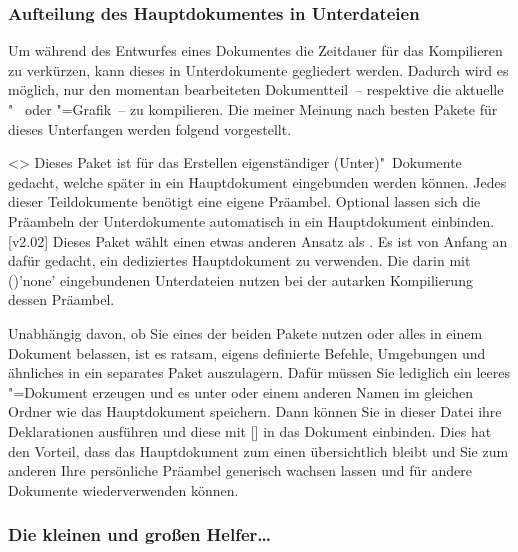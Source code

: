 \subsubsection{%
  Aufteilung des Hauptdokumentes in Unterdateien%
}

Um während des Entwurfes eines Dokumentes die Zeitdauer für das Kompilieren zu 
verkürzen, kann dieses in Unterdokumente gegliedert werden. Dadurch wird es 
möglich, nur den momentan bearbeiteten Dokumentteil~-- respektive die aktuelle 
"~ oder "=Grafik~-- zu kompilieren. Die meiner 
Meinung nach besten Pakete für dieses Unterfangen werden folgend vorgestellt.

\begin{DeclarePackages}
<>
  Dieses Paket ist für das Erstellen eigenständiger (Unter)"~Dokumente gedacht, 
  welche später in ein Hauptdokument eingebunden werden können. Jedes dieser 
  Teildokumente benötigt eine eigene Präambel. Optional lassen sich die 
  Präambeln der Unterdokumente automatisch in ein Hauptdokument einbinden.
[v2.02]
  Dieses Paket wählt einen etwas anderen Ansatz als . Es 
  ist von Anfang an dafür gedacht, ein dediziertes Hauptdokument zu verwenden. 
  Die darin mit ()'none' eingebundenen 
  Unterdateien nutzen bei der autarken Kompilierung dessen Präambel.
\end{DeclarePackages}

Unabhängig davon, ob Sie eines der beiden Pakete nutzen oder alles in einem 
Dokument belassen, ist es ratsam, eigens definierte Befehle, Umgebungen und 
ähnliches in ein separates Paket auszulagern. Dafür müssen Sie lediglich ein 
leeres "=Dokument erzeugen und es unter  
oder einem anderen Namen im gleichen Ordner wie das Hauptdokument speichern. 
Dann können Sie in dieser Datei ihre Deklarationen ausführen und diese mit 
[] in das Dokument einbinden. Dies 
hat den Vorteil, dass das Hauptdokument zum einen übersichtlich bleibt und Sie 
zum anderen Ihre persönliche Präambel generisch wachsen lassen und für andere 
Dokumente wiederverwenden können.



\subsubsection{Die kleinen und großen Helfer\dots}


